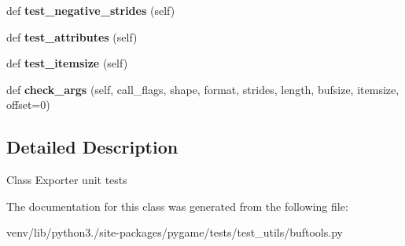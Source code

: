 \begin{DoxyCompactItemize}
def {\bfseries test\+\_\+negative\+\_\+strides} (self)
\item 
\mbox{\label{classpygame_1_1tests_1_1test__utils_1_1buftools_1_1_exporter_test_a65d84538f288ca39cfe6fe967c0a9c73}} 
def {\bfseries test\+\_\+attributes} (self)
\item 
\mbox{\label{classpygame_1_1tests_1_1test__utils_1_1buftools_1_1_exporter_test_a0068c05592776fc3ff32e9cf02eecfcd}} 
def {\bfseries test\+\_\+itemsize} (self)
\item 
\mbox{\label{classpygame_1_1tests_1_1test__utils_1_1buftools_1_1_exporter_test_af5a8c346c5cba7c05bfd897f7f80ed57}} 
def {\bfseries check\+\_\+args} (self, call\+\_\+flags, shape, format, strides, length, bufsize, itemsize, offset=0)
\end{DoxyCompactItemize}


\subsection{Detailed Description}
\begin{DoxyVerb}Class Exporter unit tests\end{DoxyVerb}
 

The documentation for this class was generated from the following file\+:\begin{DoxyCompactItemize}
\item 
venv/lib/python3./site-\/packages/pygame/tests/test\+\_\+utils/buftools.\+py\end{DoxyCompactItemize}
